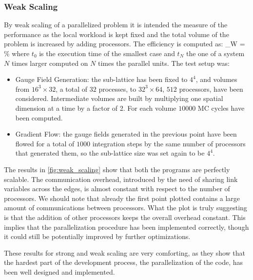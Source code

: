 \subsubsection{Weak Scaling}
By weak scaling of a parallelized problem it is intended the measure of the performance as the local workload is kept fixed and the total volume of the problem is increased by adding processors. The efficiency is computed as:
\beq
\eta_W = \% 
\label{eq:eta_weak}
\eeq 
where $t_0$ is the execution time of the smallest case and $t_N$ the one of a system $N$ times larger computed on $N$ times the parallel units. The test setup was:
\begin{itemize}
    \item Gauge Field Generation: the sub-lattice has been fixed to $4^4$, and volumes from $16^3\times32$, a total of $32$ processes, to $32^3\times64$, $512$ processors, have been considered. Intermediate volumes are built by multiplying one spatial dimension at a time by a factor of 2. For each volume $10000$ MC cycles have been computed.
    \item Gradient Flow: the gauge fields generated in the previous point have been flowed for a total of $1000$ integration steps by the same number of processors that generated them, so the sub-lattice size was set again to be $4^4$.
\end{itemize}


The results in \cref{fig:weak_scaling} show that both the programs are perfectly scalable. The communication overhead, introduced by the need of sharing link variables across the edges, is almost constant with respect to the number of processors. We should note that already the first point plotted contains a large amount of communications between processors. What the plot is truly suggesting is that the addition of other processors keeps the overall overhead constant. This implies that the parallelization procedure has been implemented correctly, though it could still be potentially improved by further optimizations.

These results for strong and weak scaling are very comforting, as they show that the hardest part of the development process, the parallelization of the code, has been well designed and implemented.


